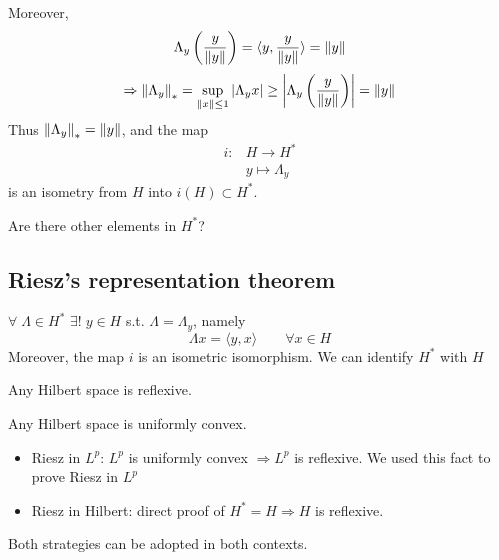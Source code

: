 Moreover, 
\[
    \Lambda_y \left(\frac{y}{\norm{y}}\right) = \langle y, \frac{y}{\norm{y}}\rangle   = \norm{y}
\]
\[
    \Rightarrow \norm{\Lambda_y}_* = \sup_{\norm{x} \leq 1} \abs{\Lambda_y x} \geq \abs{\Lambda_y \left(\frac{y}{\norm{y}}\right)} = \norm{y}
\]
Thus \( \norm{\Lambda_y}_* = \norm{y}\), and the map 
\[
    \begin{array}{rl}
        i: & H \to H^* \\
        & y \mapsto \Lambda_y    
    \end{array}
\]
is an isometry from \(H\) into \(i(H) \subset {H^*}\).

Are there other elements in \(H^*\)?
\subsection{Riesz's representation theorem}
\begin{theorem}
    \(\forall \; \Lambda \in H^* \) \(\exists! \; y \in H\) s.t. \(\Lambda = \Lambda_y\), namely
    \[
        \Lambda x = \langle y, x\rangle   \qquad \forall x \in H
    \]
    Moreover, the map \(i\) is an isometric isomorphism. We can identify \(H^*\) with \(H\)
\end{theorem}

\begin{corollary}
    Any Hilbert space is reflexive. 
\end{corollary}
\begin{remark}
    Any Hilbert space is uniformly convex.
\end{remark}

\begin{itemize}
    \item Riesz in \(L^p\): \(L^p \) is uniformly convex \(\Rightarrow L^p\) is reflexive. We used this fact to prove Riesz in \(L^p\)
    \item Riesz in Hilbert: direct proof of \(H^* = H \Rightarrow H\) is reflexive.
\end{itemize}
Both strategies can be adopted in both contexts.

